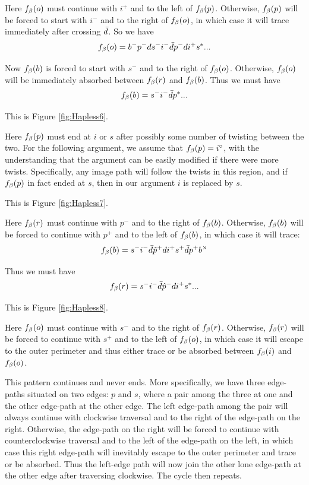 Here $f_\beta(o)$ must continue with $i^+$ and to the left of $f_\beta(p)$. Otherwise, $f_\beta(p)$ will be forced to start with $i^-$ and to the right of $f_\beta(o)$, in which case it will trace immediately after crossing $\bar{d}$. So we have
\[
f_\beta(o) = b^- p^- d s^- i^- \bar{d} p^- d i^+ s^*...
\]

Now $f_\beta(b)$ is forced to start with $s^-$ and to the right of $f_\beta(o)$. Otherwise, $f_\beta(o)$ will be immediately absorbed between $f_\beta(r)$ and $f_\beta(b)$. Thus we must have
\[
f_\beta(b) = s^- i^- \bar{d} p^*...
\]

This is Figure \ref{fig:Hapless6}.

Here $f_\beta(p)$ must end at $i$ or $s$ after possibly some number of twisting between the two. For the following argument, we assume that $f_\beta(p) = i^\circ$, with the understanding that the argument can be easily modified if there were more twists. Specifically, any image path will follow the twists in this region, and if $f_\beta(p)$ in fact ended at $s$, then in our argument $i$ is replaced by $s$.

This is Figure \ref{fig:Hapless7}.

Here $f_\beta(r)$ must continue with $p^-$ and to the right of $f_\beta(b)$. Otherwise, $f_\beta(b)$ will be forced to continue with $p^+$ and to the left of $f_\beta(b)$, in which case it will trace:
\[
f_\beta(b) = s^- i^- \bar{d} \hat{p}^+ d i^+ s^+ \bar{d} p^+ b^\times
\]

Thus we must have
\[
f_\beta(r) = s^- i^- \bar{d} \hat{p}^- d i^+ s^*...
\]

This is Figure \ref{fig:Hapless8}.

Here $f_\beta(o)$ must continue with $s^-$ and to the right of $f_\beta(r)$. Otherwise, $f_\beta(r)$ will be forced to continue with $s^+$ and to the left of $f_\beta(o)$, in which case it will escape to the outer perimeter and thus either trace or be absorbed between $f_\beta(i)$ and $f_\beta(o)$.

This pattern continues and never ends. More specifically, we have three edge-paths situated on two edges: $p$ and $s$, where a pair among the three at one and the other edge-path at the other edge. The left edge-path among the pair will always continue with clockwise traversal and to the right of the edge-path on the right. Otherwise, the edge-path on the right will be forced to continue with counterclockwise traversal and to the left of the edge-path on the left, in which case this right edge-path will inevitably escape to the outer perimeter and trace or be absorbed. Thus the left-edge path will now join the other lone edge-path at the other edge after traversing clockwise. The cycle then repeats.


